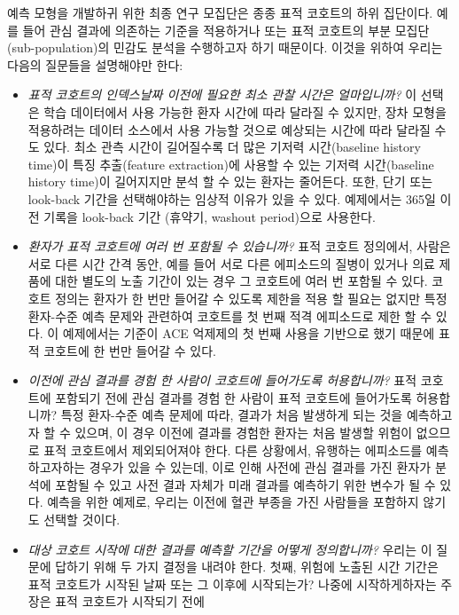 \documentclass[11pt]{book}
\theoremstyle{definition}
\theoremstyle{definition}
\theoremstyle{definition}
\theoremstyle{remark}
\begin{document}
예측 모형을 개발하귀 위한 최종 연구 모집단은 종종 표적 코호트의 하위
집단이다. 예를 들어 관심 결과에 의존하는 기준을 적용하거나 또는 표적
코호트의 부분 모집단(sub-population)의 민감도 분석을 수행하고자 하기
때문이다. 이것을 위하여 우리는 다음의 질문들을 설명해야만 한다:

\begin{itemize}
\item
  \emph{표적 코호트의 인덱스날짜 이전에 필요한 최소 관찰 시간은
  얼마입니까?} 이 선택은 학습 데이터에서 사용 가능한 환자 시간에 따라
  달라질 수 있지만, 장차 모형을 적용하려는 데이터 소스에서 사용 가능할
  것으로 예상되는 시간에 따라 달라질 수도 있다. 최소 관측 시간이
  길어질수록 더 많은 기저력 시간(baseline history time)이 특징
  추출(feature extraction)에 사용할 수 있는 기저력 시간(baseline history
  time)이 길어지지만 분석 할 수 있는 환자는 줄어든다. 또한, 단기 또는
  look-back 기간을 선택해야하는 임상적 이유가 있을 수 있다. 예제에서는
  365일 이전 기록을 look-back 기간 (휴약기, washout period)으로
  사용한다.
\item
  \emph{환자가 표적 코호트에 여러 번 포함될 수 있습니까?} 표적 코호트
  정의에서, 사람은 서로 다른 시간 간격 동안, 예를 들어 서로 다른
  에피소드의 질병이 있거나 의료 제품에 대한 별도의 노출 기간이 있는 경우
  그 코호트에 여러 번 포함될 수 있다. 코호트 정의는 환자가 한 번만
  들어갈 수 있도록 제한을 적용 할 필요는 없지만 특정 환자-수준 예측
  문제와 관련하여 코호트를 첫 번째 적격 에피소드로 제한 할 수 있다. 이
  예제에서는 기준이 ACE 억제제의 첫 번째 사용을 기반으로 했기 때문에
  표적 코호트에 한 번만 들어갈 수 있다.
\item
  \emph{이전에 관심 결과를 경험 한 사람이 코호트에 들어가도록
  허용합니까?} 표적 코호트에 포함되기 전에 관심 결과를 경험 한 사람이
  표적 코호트에 들어가도록 허용합니까? 특정 환자-수준 예측 문제에 따라,
  결과가 처음 발생하게 되는 것을 예측하고자 할 수 있으며, 이 경우 이전에
  결과를 경험한 환자는 처음 발생할 위험이 없으므로 표적 코호트에서
  제외되어져야 한다. 다른 상황에서, 유행하는 에피소드를 예측하고자하는
  경우가 있을 수 있는데, 이로 인해 사전에 관심 결과를 가진 환자가 분석에
  포함될 수 있고 사전 결과 자체가 미래 결과를 예측하기 위한 변수가 될 수
  있다. 예측을 위한 예제로, 우리는 이전에 혈관 부종을 가진 사람들을
  포함하지 않기도 선택할 것이다.
\item
  \emph{대상 코호트 시작에 대한 결과를 예측할 기간을 어떻게 정의합니까?}
  우리는 이 질문에 답하기 위해 두 가지 결정을 내려야 한다. 첫째, 위험에
  노출된 시간 기간은 표적 코호트가 시작된 날짜 또는 그 이후에
  시작되는가? 나중에 시작하게하자는 주장은 표적 코호트가 시작되기 전에

\end{itemize}
\end{document}
